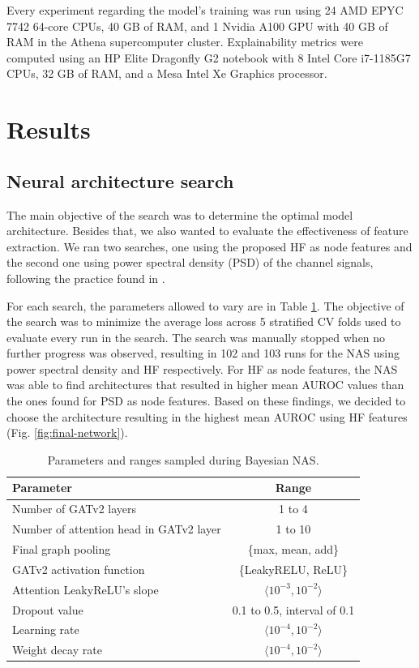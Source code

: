 \documentclass[a4paper,fleqn]{cas-sc}
\begin{document}
Every experiment regarding the model's training was run using 24 AMD EPYC 7742 64-core CPUs, 40 GB of RAM, and 1 Nvidia A100 GPU with 40 GB of RAM in the Athena supercomputer cluster. Explainability metrics were computed using an HP Elite Dragonfly G2 notebook with 8 Intel Core i7-1185G7 CPUs, 32 GB of RAM, and a Mesa Intel Xe Graphics processor.

\section{Results}
\subsection{Neural architecture search}

The main objective of the search was to determine the optimal model architecture. Besides that, we also wanted to evaluate the effectiveness of feature extraction. We ran two searches, one using the proposed HF as node features and the second one using power spectral density (PSD) of the channel signals, following the practice found in \cite{MazurekPreprocessing}.

For each search, the parameters allowed to vary are in Table \ref{tab:nas-params}. The objective of the search was to minimize the average loss across 5 stratified CV folds used to evaluate every run in the search. The search was manually stopped when no further progress was observed, resulting in 102 and 103 runs for the NAS using power spectral density and HF respectively. For HF as node features, the NAS was able to find architectures that resulted in higher mean AUROC values than the ones found for PSD as node features. Based on these findings, we decided to choose the architecture resulting in the highest mean AUROC using HF features (Fig. \ref{fig:final-network}).

\begin{table}[H]
\centering
\begin{tabular}{l||c}
\textbf{Parameter} & \textbf{Range}  \\
\hline
Number of GATv2 layers & 1 to 4  \\
Number of attention head in GATv2 layer & 1 to 10 \\
Final graph pooling & \{max, mean, add\} \\
GATv2 activation function & \{LeakyRELU, ReLU\}  \\
Attention LeakyReLU's slope & $\langle 10^{-3}, 10^{-2} \rangle$ \\
Dropout value & 0.1 to 0.5, interval of 0.1 \\
Learning rate & $\langle10^{-4}, 10^{-2} \rangle$ \\
Weight decay rate & $\langle10^{-4}, 10^{-2} \rangle$ \\
\end{tabular}
\caption{Parameters and ranges sampled during Bayesian NAS.}
\label{tab:nas-params}
\end{table}
\end{document}
